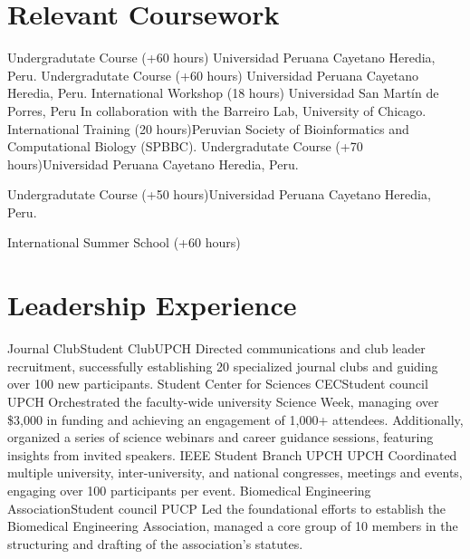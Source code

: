 \documentclass[11pt,a4paper,sans]{moderncv}
\begin{document}
\section{Relevant Coursework}
  {Undergradutate Course (+60 hours)}
  {Universidad Peruana Cayetano Heredia, Peru.}
  {}
  {}
  {Undergradutate Course (+60 hours)}
  {Universidad Peruana Cayetano Heredia, Peru.}
  {}
  {}
  {International Workshop (18 hours)}
  {Universidad San Martín de Porres, Peru}
  {In collaboration with the Barreiro Lab, University of Chicago.}
  {}
  {International Training (20 hours)}{Peruvian Society of Bioinformatics and Computational Biology (SPBBC).}{}
  {}  
  {Undergradutate Course (+70 hours)}{Universidad Peruana Cayetano Heredia, Peru.}{}
  {}

  {Undergradutate Course (+50 hours)}{Universidad Peruana Cayetano Heredia, Peru.}{}
  {}

  {International Summer School (+60 hours)}{}{}
  {}

\section{Leadership Experience}
  {Journal Club}{Student Club}{UPCH}
  {Directed communications and club leader recruitment, successfully establishing 20 specialized journal clubs and guiding over 100 new participants.
  }
  {Student Center for Sciences CEC}{Student council}
  {UPCH}
  {Orchestrated the faculty-wide university Science Week, managing over \$3,000 in funding and achieving an engagement of 1,000+ attendees. Additionally, organized a series of science webinars and career guidance sessions, featuring insights from invited speakers. 
  }
  {IEEE Student Branch UPCH}{}
  {UPCH}
  {Coordinated multiple university, inter-university, and national congresses, meetings and events, engaging over 100 participants per event.
  }
  {Biomedical Engineering Association}{Student council}
  {PUCP}
  {Led the foundational efforts to establish the Biomedical Engineering Association, managed a core group of 10 members in the structuring and drafting of the association’s statutes.
  }
\end{document}

